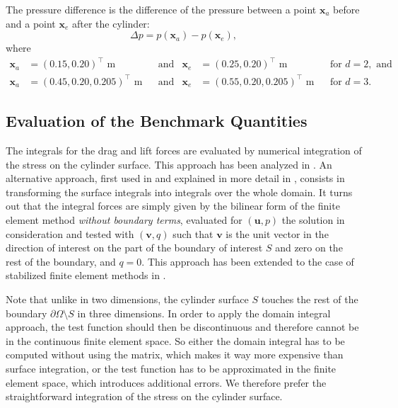 \documentclass[11pt,a4paper]{article}
\renewcommand{\vec}[1]{\boldsymbol{#1}}
\newcommand{\vvecT}[3]{\left(#2,#3 \right)^{\top}}
\newcommand{\vvvecT}[4]{\left(#2,#3,#4 \right)^{\top}}
\begin{document}
The pressure difference is the difference of the pressure between a point $\vec{x}_a$ before and a point $\vec{x}_e$ after the cylinder:
\begin{equation*}
  \Delta p=p(\vec{x}_a)-p(\vec{x}_e)
,
\end{equation*}
where
\begin{align*}
   \vec{x}_a
&= \vvecT{l}{0.15}{0.20}\mbox{ m}
& &\mbox{and} &
   \vec{x}_e
&=  \vvecT{l}{0.25}{0.20}\mbox{ m}
& &\mbox{for } d=2, \mbox{ and}\\
   \vec{x}_a
&= \vvvecT{l}{0.45}{0.20}{0.205}\mbox{ m}
& &\mbox{and} &
   \vec{x}_e
&= \vvvecT{l}{0.55}{0.20}{0.205}\mbox{ m}
& &\mbox{for } d=3.
\end{align*}


\subsection{Evaluation of the Benchmark Quantities}

The integrals for the drag and lift forces are evaluated by numerical
integration of the stress on the cylinder surface.  This approach has
been analyzed in \cite{tabata:1998}.  An alternative approach, first
used in \cite{john:2002} and explained in more detail in
\cite{braack:2005}, consists in transforming the surface integrals
into integrals over the whole domain.  It turns out that the integral
forces are simply given by the bilinear form of the finite element
method \emph{without boundary terms}, evaluated for $(\vec{u},p)$ the
solution in consideration and tested with $(\vec{v},q)$ such that
$\vec{v}$ is the unit vector in the direction of interest on the part
of the boundary of interest $S$ and zero on the rest of the boundary,
and $q=0$.  This approach has been extended to the case of stabilized
finite element methods in \cite{braack:2004}.

Note that unlike in two dimensions, the cylinder surface $S$ touches
the rest of the boundary $\partial\Omega\setminus S$ in three
dimensions.  In order to apply the domain integral approach, the test
function should then be discontinuous and therefore cannot be in the
continuous finite element space.  So either the domain integral has to
be computed without using the matrix, which makes it way more
expensive than surface integration, or the test function has to be
approximated in the finite element space, which introduces additional
errors.  We therefore prefer the straightforward integration of the
stress on the cylinder surface.






\end{document}
